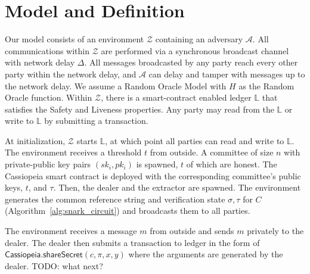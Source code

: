 \section{Model and Definition}

Our model consists of an environment $\mathcal{Z}$ containing an adversary $\mathcal{A}$.
All communications within $\mathcal{Z}$ are performed via a synchronous broadcast channel with network delay $\Delta$.
All messages broadcasted by any party reach every other party within the network delay, and $\mathcal{A}$ can delay and tamper with messages up to the network delay.
We assume a Random Oracle Model with $H$ as the Random Oracle function.
Within $\mathcal{Z}$, there is a smart-contract enabled ledger $\mathbb{L}$ that satisfies the Safety and Liveness properties.
Any party may read from the $\mathbb{L}$ or write to $\mathbb{L}$ by submitting a transaction.

At initialization, $\mathcal{Z}$ starts $\mathbb{L}$, at which point all parties can read and write to $\mathbb{L}$.
The environment receives a threshold $t$ from outside.
A committee of size $n$ with private-public key pairs $(sk_i, pk_i)$ is spawned, $t$ of which are honest.
The Cassiopeia smart contract is deployed with the corresponding committee's public keys, $t$, and $\tau$.
Then, the dealer and the extractor are spawned.
The environment generates the common reference string and verification state $\sigma, \tau$ for $C$ (Algorithm~\ref{alg:snark_circuit}) and broadcasts them to all parties.

The environment receives a message $m$ from outside and sends $m$ privately to the dealer.
The dealer then submits a transaction to ledger in the form of $\textsf{Cassiopeia.shareSecret}(c, \pi, x, y)$ where the arguments are generated by the dealer. %
TODO: what next?


